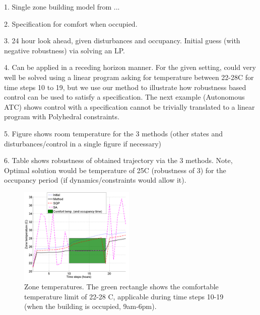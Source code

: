 
1. Single zone building model from ...

2. Specification for comfort when occupied.

3. 24 hour look ahead, given disturbances and occupancy. Initial guess (with negative robustness) via solving an LP.

4. Can be applied in a receding horizon manner. For the given setting, could very well be solved using a linear program asking for temperature between 22-28C for time steps 10 to 19, but we use our method to illustrate how robustness based control can be used to satisfy a specification. The next example (Autonomous ATC) shows control with a specification cannot be trivially translated to a linear program with Polyhedral constraints.

5. Figure shows room temperature for the 3 methods (other states and disturbances/control in a single figure if necessary)

6. Table shows robustness of obtained trajectory via the 3 methods. Note, Optimal solution would be temperature of 25C  (robustness of 3) for the occupancy period (if dynamics/constraints would allow it).

\begin{figure}[t]
\centering
\includegraphics[width=0.49\textwidth]{figures/ZoneTemp_scissored}
\caption{Zone temperatures. The green rectangle shows the comfortable temperature limit of 22-28 C, applicable during time steps 10-19 (when the building is occupied, 9am-6pm).}
\label{fig:ZoneTemp}
\end{figure}
